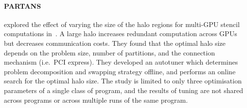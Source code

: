 \paragraph{PARTANS} \citeauthor{Lutz2013} explored the effect of
varying the size of the halo regions for multi-GPU stencil
computations in~\cite{Lutz2013}. A large halo increases redundant
computation across GPUs but decreases communication costs. They found
that the optimal halo size depends on the problem size, number of
partitions, and the connection mechanism (i.e.\ PCI express). They
developed an autotuner which determines problem decomposition and
swapping strategy offline, and performs an online search for the
optimal halo size. The study is limited to only three optimisation
parameters of a single class of program, and the results of tuning are
not shared across programs or across multiple runs of the same
program.
